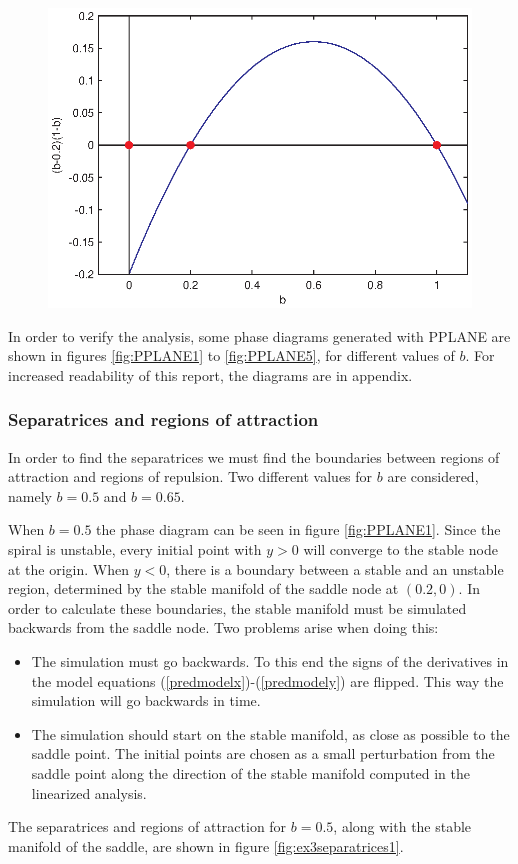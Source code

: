 \begin{figure}[htp]
\centering
\includegraphics{img/ex3/btrajectory.eps}
\caption{}
\label{fig:ex3trajectory}
\end{figure}

In order to verify the analysis, some phase diagrams generated with PPLANE are shown in figures \ref{fig:PPLANE1} to \ref{fig:PPLANE5}, for different values of $b$. For increased readability of this report, the diagrams are in appendix.

\subsubsection{Separatrices and regions of attraction}
In order to find the separatrices we must find the boundaries between regions of attraction and regions of repulsion. Two different values for $b$ are considered, namely $b=0.5$ and $b=0.65$. 

When $b=0.5$ the phase diagram can be seen in figure \ref{fig:PPLANE1}. Since the spiral is unstable, every initial point with $y>0$ will converge to the stable node at the origin. When $y<0$, there is a boundary between a stable and an unstable region, determined by the stable manifold of the saddle node at $(0.2,0)$. In order to calculate these boundaries, the stable manifold must be simulated backwards from the saddle node. Two problems arise when doing this:
\begin{itemize}
\item The simulation must go backwards. To this end the signs of the derivatives in the model equations (\ref{predmodelx})-(\ref{predmodely}) are flipped. This way the simulation will go backwards in time.
\item The simulation should start on the stable manifold, as close as possible to the saddle point. The initial points are chosen as a small perturbation from the saddle point along the direction of the stable manifold computed in the linearized analysis.
\end{itemize}
The separatrices and regions of attraction for $b=0.5$, along with the stable manifold of the saddle, are shown in figure \ref{fig:ex3separatrices1}.


